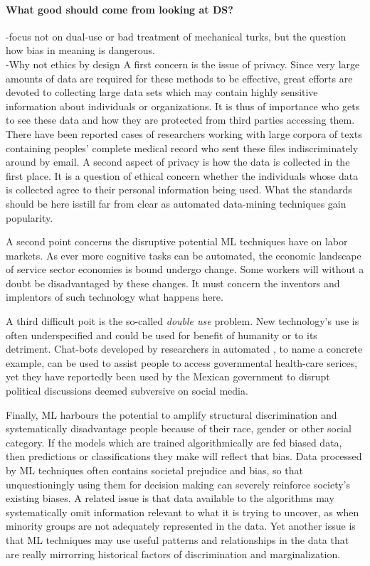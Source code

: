 \documentclass{article}
\begin{document}
\paragraph{What good should come from looking at DS?}
-focus not on dual-use or bad treatment of mechanical turks, but the question how bias in meaning is dangerous.\\
-Why not ethics by design
A first concern is the issue of privacy. Since very large amounts of data are required for these methods to be effective, great efforts are devoted to collecting large data sets which may contain highly sensitive information about individuals or organizations. It is thus of importance who gets to see these data and how they are protected from third parties accessing them. There have been reported cases of researchers working with large corpora of texts containing peoples' complete medical record who sent these files indiscriminately around by email. A second aspect of privacy is how the data is collected in the first place. It is a question of ethical concern whether the individuals whose data is collected agree to their personal information being used. What the standards should be here isstill  far from clear as automated data-mining techniques gain popularity.

A second point concerns the disruptive potential ML techniques have on labor markets. As ever more cognitive tasks can be automated, the economic landscape of service sector economies is bound undergo change. Some workers will without a doubt be disadvantaged by these changes. It must concern the inventors and implentors of such technology what happens here.

A third difficult poit is the so-called \emph{double use} problem. New technology's use is often underspecified and could be used for benefit of humanity or to its detriment. Chat-bots developed by researchers in automated , to name a concrete example, can be used to assist people to access governmental health-care serices, yet they have reportedly been used by the Mexican government to disrupt political discussions deemed subversive on social media. \cite{leidner2017ethical}

Finally, ML harbours the potential to amplify structural discrimination and systematically disadvantage people because of their race, gender or other social category. If the models which are trained algorithmically are fed biased data, then predictions or classifications they make will reflect that bias.
Data processed by ML techniques often contains societal prejudice and bias, so that unquestioningly using them for decision making can severely reinforce society's existing biases. A related issue is that data available to the algorithms may systematically omit information relevant to what it is trying to uncover, as when minority groups are not adequately represented in the data. Yet another issue is that ML techniques may use useful patterns and relationships in the data that are really mirrorring historical factors of discrimination and marginalization. \cite{barocas2016big}
\end{document}
